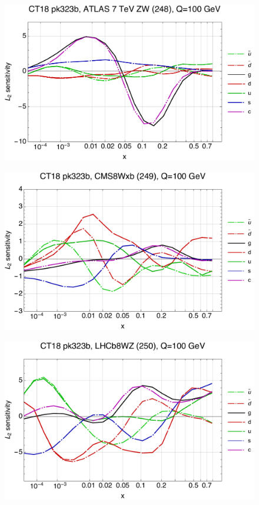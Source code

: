 \documentclass[10pt,aps,prd,floatfix,titlepage]{revtex4}
\begin{document}
\begin{figure}
\includegraphics[width=\textwidth,height=0.44\textheight,keepaspectratio]{1/248_ct18nn_L2_q100_Sf_1.pdf}
\caption{}
\end{figure}
\clearpage
\begin{figure}
\includegraphics[width=\textwidth,height=0.44\textheight,keepaspectratio]{1/249_ct18nn_L2_q100_Sf_1.pdf}
\caption{}
\end{figure}
\begin{figure}
\includegraphics[width=\textwidth,height=0.44\textheight,keepaspectratio]{1/250_ct18nn_L2_q100_Sf_1.pdf}
\caption{}
\end{figure}
\end{document}

